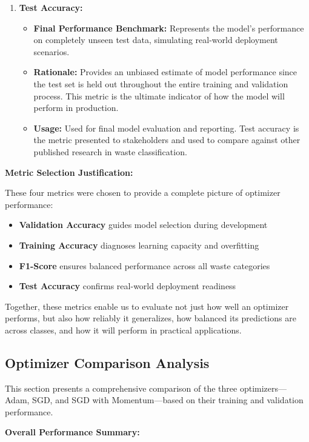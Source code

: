 \documentclass[12pt,a4paper]{article}
\begin{document}
\begin{enumerate}
    \item \textbf{Test Accuracy:}
    \begin{itemize}
        \item \textbf{Final Performance Benchmark:} Represents the model's performance on completely unseen test data, simulating real-world deployment scenarios.
        \item \textbf{Rationale:} Provides an unbiased estimate of model performance since the test set is held out throughout the entire training and validation process. This metric is the ultimate indicator of how the model will perform in production.
        \item \textbf{Usage:} Used for final model evaluation and reporting. Test accuracy is the metric presented to stakeholders and used to compare against other published research in waste classification.
    \end{itemize}
\end{enumerate}

\textbf{Metric Selection Justification:}

These four metrics were chosen to provide a complete picture of optimizer performance:
\begin{itemize}
    \item \textbf{Validation Accuracy} guides model selection during development
    \item \textbf{Training Accuracy} diagnoses learning capacity and overfitting
    \item \textbf{F1-Score} ensures balanced performance across all waste categories
    \item \textbf{Test Accuracy} confirms real-world deployment readiness
\end{itemize}

Together, these metrics enable us to evaluate not just how well an optimizer performs, but also how reliably it generalizes, how balanced its predictions are across classes, and how it will perform in practical applications.

\subsection{Optimizer Comparison Analysis}

This section presents a comprehensive comparison of the three optimizers—Adam, SGD, and SGD with Momentum—based on their training and validation performance.

\textbf{Overall Performance Summary:}
\end{document}
